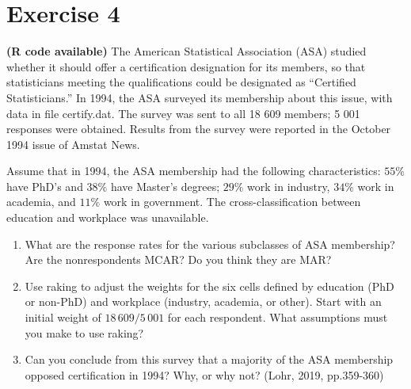 \documentclass[12pt]{article}
\begin{document}
\section*{Exercise 4}
\textbf{\color{ForestGreen}(R code available)} The American Statistical Association (ASA) studied whether it should offer a certification
designation for its members, so that statisticians meeting the qualifications
could be designated as “Certified Statisticians.” In 1994, the ASA surveyed its membership
about this issue, with data in file certify.dat. The survey was sent to all 18 609
members; 5 001 responses were obtained. Results from the survey were reported in
the October 1994 issue of Amstat News.

Assume that in 1994, the ASA membership had the following characteristics: $55\%$
have PhD’s and $38\%$ have Master’s degrees; $29\%$ work in industry, $34\%$ work in
academia, and $11\%$ work in government. The cross-classification between education
and workplace was unavailable.
\begin{enumerate}
\item What are the response rates for the various subclasses of ASA membership? Are
the nonrespondents MCAR? Do you think they are MAR?
\item Use raking to adjust the weights for the six cells defined by education (PhD
or non-PhD) and workplace (industry, academia, or other). Start with an initial
weight of $18\,609/5\,001$ for each respondent. What assumptions must you make to
use raking?
\item Can you conclude from this survey that a majority of the ASA membership
opposed certification in 1994? Why, or why not? \hfill (Lohr, 2019, pp.359-360) 
\end{enumerate}
\end{document}
